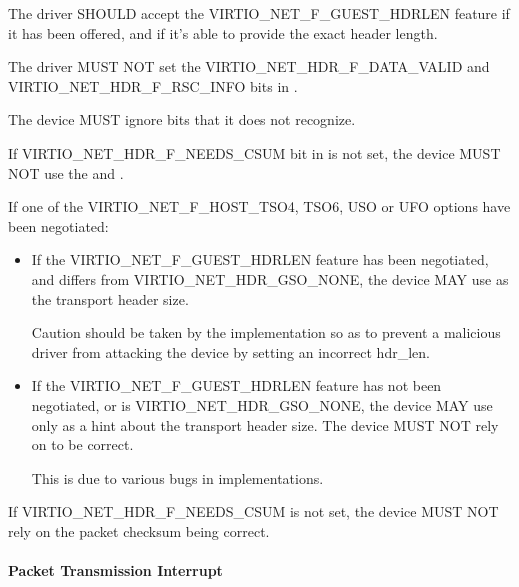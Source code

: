 The driver SHOULD accept the VIRTIO_NET_F_GUEST_HDRLEN feature if it has
been offered, and if it's able to provide the exact header length.

The driver MUST NOT set the VIRTIO_NET_HDR_F_DATA_VALID and
VIRTIO_NET_HDR_F_RSC_INFO bits in .

The device MUST ignore  bits that it does not recognize.

If VIRTIO_NET_HDR_F_NEEDS_CSUM bit in  is not set, the
device MUST NOT use the  and .

If one of the VIRTIO_NET_F_HOST_TSO4, TSO6, USO or UFO options have
been negotiated:
\begin{itemize}
\item If the VIRTIO_NET_F_GUEST_HDRLEN feature has been negotiated,
	and  differs from VIRTIO_NET_HDR_GSO_NONE,
	the device MAY use  as the transport header size.

	\begin{note}
	Caution should be taken by the implementation so as to prevent
	a malicious driver from attacking the device by setting an incorrect hdr_len.
	\end{note}

\item If the VIRTIO_NET_F_GUEST_HDRLEN feature has not been negotiated,
	or  is VIRTIO_NET_HDR_GSO_NONE,
	the device MAY use  only as a hint about the
	transport header size.
	The device MUST NOT rely on  to be correct.

	\begin{note}
	This is due to various bugs in implementations.
	\end{note}
\end{itemize}

If VIRTIO_NET_HDR_F_NEEDS_CSUM is not set, the device MUST NOT
rely on the packet checksum being correct.
\paragraph{Packet Transmission Interrupt}\label{sec:Device Types / Network Device / Device Operation / Packet Transmission / Packet Transmission Interrupt}

